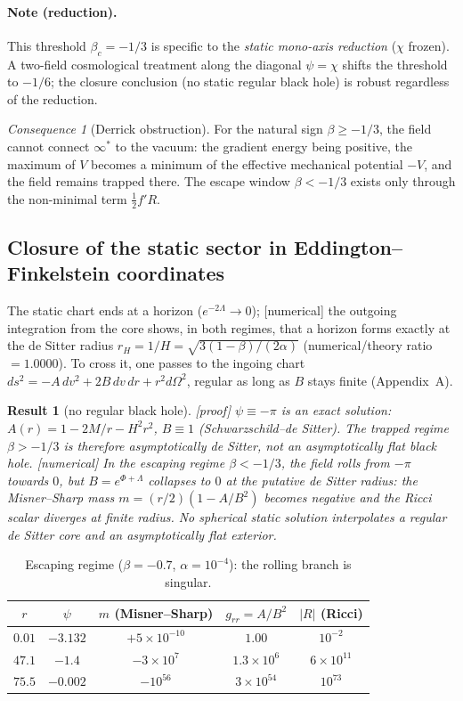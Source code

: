 \documentclass[11pt,a4paper]{article}
\newcommand{\statut}[1]{{\footnotesize\textsf{[#1]}}}
\theoremstyle{plain}
\newtheorem{result}{Result}
\theoremstyle{remark}
\newtheorem*{consequence}{Consequence}
\begin{document}
\paragraph{Note (reduction).} This threshold $\beta_c=-1/3$ is specific to the
\emph{static mono-axis reduction} ($\chi$ frozen). A two-field cosmological treatment along
the diagonal $\psi=\chi$ shifts the threshold to $-1/6$; the closure conclusion (no static
regular black hole) is robust regardless of the reduction.

\begin{consequence}[Derrick obstruction]
For the natural sign $\beta\ge-1/3$, the field cannot connect $\infty^*$ to the vacuum: the
gradient energy being positive, the maximum of $V$ becomes a minimum of the effective
mechanical potential $-V$, and the field remains trapped there. The escape window
$\beta<-1/3$ exists only through the non-minimal term $\tfrac12 f'R$.
\end{consequence}

\subsection{Closure of the static sector in Eddington--Finkelstein coordinates}
The static chart ends at a horizon ($e^{-2\Lambda}\to0$); \statut{numerical} the outgoing
integration from the core shows, in both regimes, that a horizon forms exactly at the de
Sitter radius $r_H=1/H=\sqrt{3(1-\beta)/(2\alpha)}$ (numerical/theory ratio $=1.0000$). To
cross it, one passes to the ingoing chart $ds^2=-A\,dv^2+2B\,dv\,dr+r^2d\Omega^2$, regular as
long as $B$ stays finite (Appendix~A).

\begin{result}[no regular black hole]\label{res:closure}
\statut{proof} $\psi\equiv-\pi$ is an exact solution: $A(r)=1-2M/r-H^2r^2$, $B\equiv1$
(Schwarzschild--de Sitter). The trapped regime $\beta>-1/3$ is therefore asymptotically de
Sitter, not an asymptotically flat black hole. \statut{numerical} In the escaping regime
$\beta<-1/3$, the field rolls from $-\pi$ towards $0$, but $B=e^{\Phi+\Lambda}$ collapses to
$0$ at the putative de Sitter radius: the Misner--Sharp mass $m=(r/2)(1-A/B^2)$ becomes
negative and the Ricci scalar diverges at finite radius. No spherical static solution
interpolates a regular de Sitter core and an asymptotically flat exterior.
\end{result}

\begin{table}[h]\centering\small
\begin{tabular}{ccccc}
\toprule
$r$ & $\psi$ & $m$ (Misner--Sharp) & $g_{rr}=A/B^2$ & $|R|$ (Ricci)\\
\midrule
$0.01$ & $-3.132$ & $+5\times10^{-10}$ & $1.00$ & $10^{-2}$\\
$47.1$ & $-1.4$ & $-3\times10^{7}$ & $1.3\times10^{6}$ & $6\times10^{11}$\\
$75.5$ & $-0.002$ & $-10^{56}$ & $3\times10^{54}$ & $10^{73}$\\
\bottomrule
\end{tabular}
\caption{\small Escaping regime ($\beta=-0.7$, $\alpha=10^{-4}$): the rolling branch is
singular.}\label{tab:escape}
\end{table}
\end{document}
